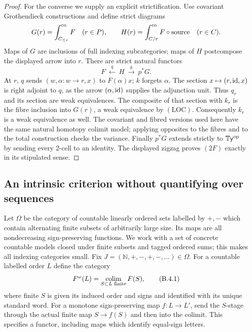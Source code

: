 \begin{proof}
For the converse we supply an explicit strictification. Use
covariant Grothendieck constructions and define strict diagrams
\[
 G(r)=\int_{C_{\leq r}}^{\rm co}F\quad(r\in P),\qquad
 H(r)=\int_{C/r}^{\rm co}F\circ\mathrm{source}\quad(r\in C).
\]
Maps of $G$ are inclusions of full indexing subcategories;
maps of $H$ postcompose the displayed arrow into $r$.
There are strict natural functors
\[
 F\ \xleftarrow{q}\ H\ \xrightarrow{k}\ p^*G.
\]
At $r$, $q$ sends $(w,\alpha:w\to r,x)$ to $F(\alpha)x$;
$k$ forgets $\alpha$. The section $x\mapsto(r,\mathrm{id},x)$ is
right adjoint to $q$, as the arrow $(\alpha,\mathrm{id})$ supplies
the adjunction unit. Thus $q_r$ and its section are weak
equivalences. The composite of that section with $k_r$ is the
fibre inclusion into $G(r)$, a weak equivalence by $(\mathrm{LOC})$.
Consequently $k_r$ is a weak equivalence as well. The covariant
and fibred versions used here have the same natural homotopy
colimit model; applying opposites to the fibres and to the total
construction checks the variance. Finally $p^*G$ extends strictly
to $\mathbb{T}\mathsf{y}^{\mathrm{op}}$ by sending every 2-cell to an identity. The
displayed zigzag proves $(2F)$ exactly in its stipulated sense.
\end{proof}

\subsection{An intrinsic criterion without quantifying over sequences}

Let $\Omega$ be the category of countable linearly ordered sets
labelled by $+,-$ which contain alternating finite subsets of
arbitrarily large size. Its maps are all nondecreasing
sign-preserving functions. We work with a set of concrete countable
models closed under finite subsets and tagged ordered sums; this
makes all indexing categories small. Fix
$J=(\mathbb N,+,-,+,-,\ldots)\in\Omega$.
For a countable labelled order $L$ define the category
\[
 F^\omega(L)=\operatorname*{colim}_{S\subset L\text{ finite}}F(S),
 \tag{B.4.1}
\]
where finite $S$ is given its induced order and signs and identified
with its unique standard word. For a monotone sign-preserving map
$f:L\to L'$, send the $S$-stage through the actual finite map
$S\to f(S)$ and then into the colimit. This specifies a functor,
including maps which identify equal-sign letters.

